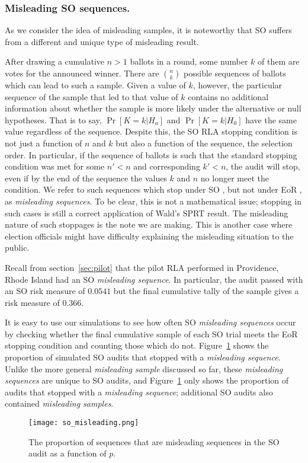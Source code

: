 \subsubsection{Misleading SO \BRAVO sequences.} As we consider the idea of misleading samples, it is noteworthy that SO \BRAVO suffers from a different and unique type of misleading result. 

After drawing a cumulative $n>1$ ballots in a round, some number $k$ of them are votes for the announced winner. There are $\binom{n}{k}$ possible sequences of ballots which can lead to such a sample. Given a value of $k$, however, the particular sequence of the sample that led to that value of $k$ contains no additional information about whether the sample is more likely under the alternative or null hypotheses. That is to say, $\Pr[K=k|H_a]$ and $\Pr[K=k|H_0]$ have the same value regardless of the sequence.
Despite this, the SO \BRAVO RLA stopping condition is not just a function of $n$ and $k$ but also a function of the sequence, the selection order. In particular, if the sequence of ballots is such that the standard \BRAVO stopping condition was met for some $n'<n$ and corresponding $k'<n$, the audit will stop, even if by the end of the sequence the values $k$ and $n$ no longer meet the \BRAVO condition. We refer to such sequences which stop under SO \BRAVO, but not under EoR \BRAVO, as \emph{misleading sequences}. To be clear, this is not a mathematical issue; stopping in such cases is still a correct application of Wald's SPRT result\cite{wald}. The misleading nature of such stoppages is the note we are making. This is another case where election officials might have difficulty explaining the misleading situation to the public.

Recall from section~\ref{sec:pilot} that the pilot \Providence RLA performed in Providence, Rhode Island had an SO \BRAVO \emph{misleading sequence}. In particular, the audit passed with an SO \BRAVO risk measure of $0.0541$ but the final cumulative tally of the sample gives a \BRAVO risk measure of $0.366$.

It is easy to use our simulations to see how often SO \BRAVO \emph{misleading sequences} occur by checking whether the final cumulative sample of each SO \BRAVO trial meets the EoR \BRAVO stopping condition and counting those which do not. Figure~\ref{so_misleading} shows the proportion of simulated SO \BRAVO audits that stopped with a \emph{misleading sequence}. Unlike the more general \emph{misleading sample} discussed so far, these \emph{misleading sequences} are unique to SO \BRAVO audits, and Figure~\ref{so_misleading} only shows the proportion of audits that stopped with a \emph{misleading sequence}; additional SO \BRAVO audits also contained \emph{misleading samples}.

\begin{figure}
\texttt{[image: so\_misleading.png]}
\caption{The proportion of sequences that are misleading sequences in the SO \BRAVO audit as a function of $p$.}
\label{so_misleading}
\end{figure}




